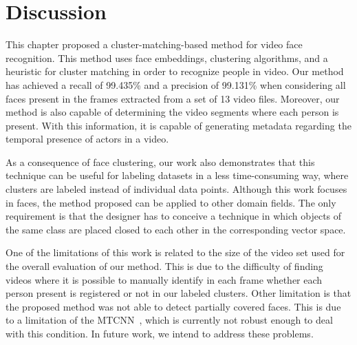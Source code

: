 \section{Discussion}
\label{sec:recognition_discussion}

This chapter proposed a cluster-matching-based method for video face recognition. 
This method uses face embeddings, clustering algorithms, and a heuristic for cluster matching in order to recognize people in video. 
Our method has achieved a recall of 99.435\% and a precision of 99.131\% when considering all faces present in the frames extracted from a set of 13 video files.  
Moreover, our method is also capable of determining the video segments where each person is present.
With this information, it is capable of generating metadata regarding the temporal presence of actors in a video.

As a consequence of face clustering, our work also demonstrates that this technique can be useful for labeling datasets in a less time-consuming way, where clusters are labeled instead of individual data points.
Although this work focuses in faces, the method proposed can be applied to other domain fields.
The only requirement is that the designer has to  conceive a technique in which objects of the same class are placed closed to each other in the corresponding vector space.

One of the limitations of this work is related to the size of the video set used for the overall evaluation of our method. 
This is due to the difficulty of finding videos where it is possible to manually identify in each frame whether each person present is registered or not in our labeled clusters.
Other limitation is that the proposed method was not able to detect partially covered faces. 
This is due to a limitation of the MTCNN~\cite{mtcnn}, which is currently not robust enough to deal with this condition.
In future work, we intend to address these problems.